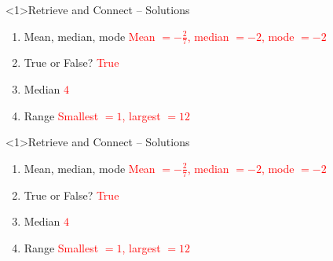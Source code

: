 \documentclass{beamer}
\begin{document}
\begin{frame}<1>{Retrieve and Connect -- Solutions}
\vspace{-0.8em}

\footnotesize
\begin{enumerate}\itemsep2pt
  \item Mean, median, mode  
        \textcolor{red}{Mean $=-\frac{2}{7}$, median $=-2$, mode $=-2$}
  \item True or False?  
        \textcolor{red}{True}
  \item Median  
        \textcolor{red}{$4$}
  \item Range  
        \textcolor{red}{Smallest $=1$, largest $=12$}
\end{enumerate}
\end{frame}
\begin{frame}<1>{Retrieve and Connect -- Solutions}
\vspace{-0.8em}

\footnotesize
\begin{enumerate}\itemsep2pt
  \item Mean, median, mode  
        \textcolor{red}{Mean $=-\frac{2}{7}$, median $=-2$, mode $=-2$}
  \item True or False?  
        \textcolor{red}{True}
  \item Median  
        \textcolor{red}{$4$}
  \item Range  
        \textcolor{red}{Smallest $=1$, largest $=12$}
\end{enumerate}
\end{frame}
\end{document}
